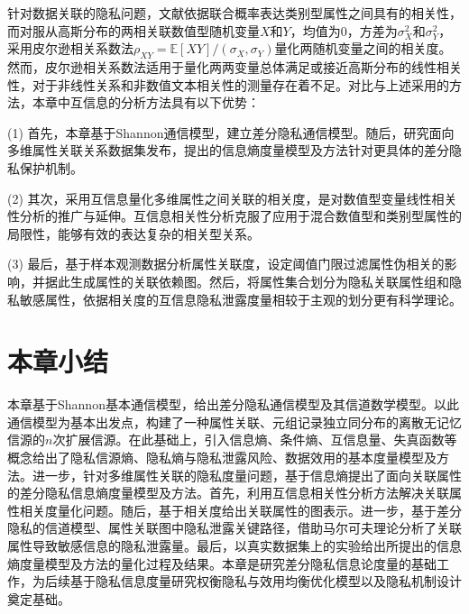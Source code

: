 针对数据关联的隐私问题，文献依据联合概率表达类别型属性之间具有的相关性，而对服从高斯分布的两相关联数值型随机变量$X$和$Y$，均值为$0$，方差为$\sigma_{X}^{2}$和$\sigma_{Y}^{2}$，采用皮尔逊相关系数法$\rho_{XY}=\mathbb{E}[XY]/(\sigma_X,\sigma_Y)$量化两随机变量之间的相关度。 然而，皮尔逊相关系数法适用于量化两两变量总体满足或接近高斯分布的线性相关性，对于非线性关系和非数值文本相关性的测量存在着不足。对比与上述采用的方法，本章中互信息的分析方法具有以下优势：

(1) 首先，本章基于Shannon通信模型，建立差分隐私通信模型。随后，研究面向多维属性关联关系数据集发布，提出的信息熵度量模型及方法针对更具体的差分隐私保护机制。

(2) 其次，采用互信息量化多维属性之间关联的相关度，是对数值型变量线性相关性分析的推广与延伸。互信息相关性分析克服了应用于混合数值型和类别型属性的局限性，能够有效的表达复杂的相关型关系。

(3) 最后，基于样本观测数据分析属性关联度，设定阈值门限过滤属性伪相关的影响，并据此生成属性的关联依赖图。然后，将属性集合划分为隐私关联属性组和隐私敏感属性，依据相关度的互信息隐私泄露度量相较于主观的划分更有科学理论。

\section{本章小结}
本章基于Shannon基本通信模型，给出差分隐私通信模型及其信道数学模型。以此通信模型为基本出发点，构建了一种属性关联、元组记录独立同分布的离散无记忆信源的$n$次扩展信源。在此基础上，引入信息熵、条件熵、互信息量、失真函数等概念给出了隐私信源熵、隐私熵与隐私泄露风险、数据效用的基本度量模型及方法。进一步，针对多维属性关联的隐私度量问题，基于信息熵提出了面向关联属性的差分隐私信息熵度量模型及方法。首先，利用互信息相关性分析方法解决关联属性相关度量化问题。随后，基于相关度给出关联属性的图表示。进一步，基于差分隐私的信道模型、属性关联图中隐私泄露关键路径，借助马尔可夫理论分析了关联属性导致敏感信息的隐私泄露量。最后，以真实数据集上的实验给出所提出的信息熵度量模型及方法的量化过程及结果。本章是研究差分隐私信息论度量的基础工作，为后续基于隐私信息度量研究权衡隐私与效用均衡优化模型以及隐私机制设计奠定基础。

